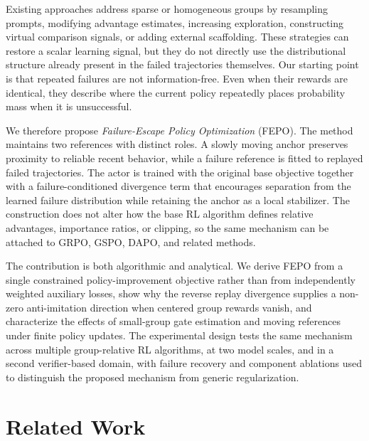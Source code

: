 \documentclass{article}
\newcommand{\FEPO}{\textsc{FEPO}\xspace}
\begin{document}
Existing approaches address sparse or homogeneous groups by resampling prompts, modifying advantage estimates, increasing exploration, constructing virtual comparison signals, or adding external scaffolding. These strategies can restore a scalar learning signal, but they do not directly use the distributional structure already present in the failed trajectories themselves. Our starting point is that repeated failures are not information-free. Even when their rewards are identical, they describe where the current policy repeatedly places probability mass when it is unsuccessful.

We therefore propose \emph{Failure-Escape Policy Optimization} (\FEPO). The method maintains two references with distinct roles. A slowly moving anchor preserves proximity to reliable recent behavior, while a failure reference is fitted to replayed failed trajectories. The actor is trained with the original base objective together with a failure-conditioned divergence term that encourages separation from the learned failure distribution while retaining the anchor as a local stabilizer. The construction does not alter how the base RL algorithm defines relative advantages, importance ratios, or clipping, so the same mechanism can be attached to GRPO, GSPO, DAPO, and related methods.

The contribution is both algorithmic and analytical. We derive \FEPO from a single constrained policy-improvement objective rather than from independently weighted auxiliary losses, show why the reverse replay divergence supplies a non-zero anti-imitation direction when centered group rewards vanish, and characterize the effects of small-group gate estimation and moving references under finite policy updates. The experimental design tests the same mechanism across multiple group-relative RL algorithms, at two model scales, and in a second verifier-based domain, with failure recovery and component ablations used to distinguish the proposed mechanism from generic regularization.

\section{Related Work}
\label{sec:related}
\end{document}
